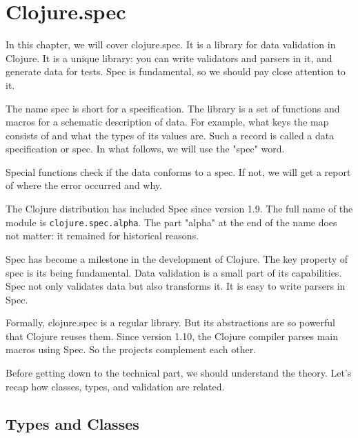 \chapter{Clojure.spec}

\label{chapter-spec}


\begin{teaser}
In this chapter, we will cover clojure.spec. It is a library for data validation in Clojure. It is a unique library: you can write validators and parsers in it, and generate data for tests. Spec is fundamental, so we should pay close attention to it.
\end{teaser}

The name spec is short for a specification. The library is a set of functions and macros for a schematic description of data. For example, what keys the map consists of and what the types of its values are. Such a record is called a data specification or spec. In what follows, we will use the "spec" word.

Special functions check if the data conforms to a spec. If not, we will get a report of where the error occurred and why.


The Clojure distribution has included Spec since version 1.9. The full name of the module is \verb|clojure.spec.alpha|. The part "alpha" at the end of the name does not matter: it remained for historical reasons.


Spec has become a milestone in the development of Clojure. The key property of spec is its being fundamental. Data validation is a small part of its capabilities. Spec not only validates data but also transforms it. It is easy to write parsers in Spec. 

Formally, clojure.spec is a regular library. But its abstractions are so powerful that Clojure reuses them. Since version 1.10, the Clojure compiler parses main macros using Spec. So the projects complement each other.

Before getting down to the technical part, we should understand the theory. Let's recap how classes, types, and validation are related.

\section{Types and Classes}

